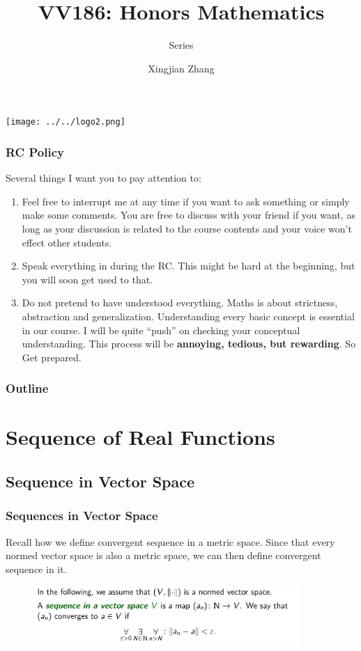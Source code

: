 \documentclass[10pt, t]{beamer}
\title{VV186: Honors Mathematics}
\subtitle{Series}
\institute[UM-SJTU JI]{Univerity of Michigan-Shanghai Jiao Tong University Joint Institute}
\author{Xingjian Zhang}
\newcommand{\alarm}[1]{{\color{bladerunnerred}{#1}}}
\begin{document}
\begin{frame}
    \titlepage
    \begin{center}
        \texttt{[image: ../../logo2.png]}
    \end{center}
\end{frame}

\begin{frame}
    \frametitle{RC Policy}
    Several things I want you to pay attention to:
    \begin{enumerate}
        \item \alarm{Be interactive.} Feel free to interrupt me at any time if you want to ask something or simply make some comments. You are free to discuss with your friend if you want, as long as your discussion is related to the course contents and your voice won't effect other students.
        \item Speak everything in \alarm{English} during the RC. This might be hard at the beginning, but you will soon get used to that.
        \item \alarm{``Question everything.''} Do not pretend to have understood everything. Maths is about strictness, abstraction and generalization. Understanding every basic concept is essential in our course. I will be quite ``push'' on checking your conceptual understanding. This process will be \textbf{annoying, tedious, but rewarding}. So Get prepared.
    \end{enumerate}
\end{frame}

\begin{frame}
    \frametitle{Outline}
    \begin{spacing}{1}
        \tableofcontents
    \end{spacing}
\end{frame}

\section{Sequence of Real Functions}
\subsection{Sequence in Vector Space}
\begin{frame}
    \frametitle{Sequences in Vector Space}
    Recall how we define convergent sequence in a metric space. Since that every normed vector space is also a metric space, we can then define convergent sequence in it.
    \begin{figure}[H]
        \centering
        \includegraphics[width=0.9\textwidth]{2020-11-11-12-36-36.png}
    \end{figure}
\end{frame}
\end{document}
